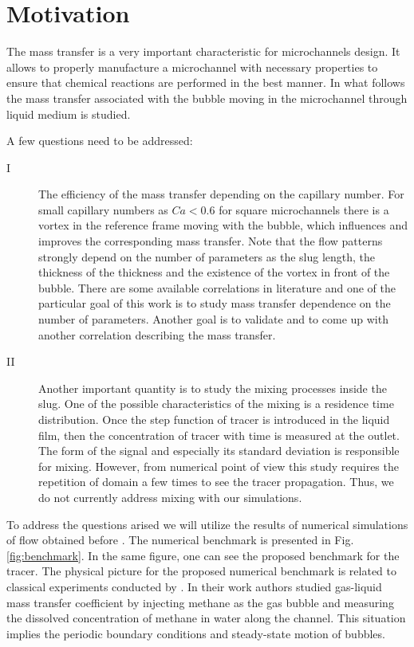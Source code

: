 \documentclass{article}
\begin{document}
\section{Motivation}
The mass transfer is a very important characteristic for microchannels  design. It allows to
properly manufacture a microchannel with necessary properties to ensure that chemical
reactions are performed in the best manner. In
what follows the mass transfer associated with the bubble moving in the microchannel through liquid
medium is studied. 

A few questions need to be addressed:
\begin{description}
 \item[I] The efficiency of the mass transfer depending on the capillary number. For small capillary
numbers as $Ca<0.6$ for square microchannels there is a vortex in the reference frame moving with
the bubble, which  influences and improves the corresponding mass transfer. 
Note that the flow
patterns strongly depend on the number of parameters as the slug length, the thickness of the
thickness and the existence of the vortex in front of the bubble. There are some available
correlations in literature \cite{bercic-mass,kreutzer-overview} and one of the particular goal of
this work is to study mass transfer dependence on the number of parameters. Another goal is to
validate and to come up with another correlation describing the mass transfer.

 \item[II] Another important quantity is to study the mixing processes inside the slug. One of the
possible characteristics of the mixing is a residence time distribution. Once the step function
of tracer is introduced in the liquid film, then the concentration of tracer with time is
measured at the outlet. The form of the signal and especially its standard deviation is responsible
for mixing. However, from numerical point of view this study requires the repetition of domain a
few times to see the tracer propagation. Thus, we do not currently address mixing with our
simulations.
\end{description}

To address the questions arised we will utilize the results of numerical simulations of flow
obtained
before \cite{kuzmin-binary2d}. The numerical benchmark is presented in Fig. \ref{fig:benchmark}. In
the same figure, one can see the proposed benchmark for the tracer. The
physical
picture for the proposed numerical benchmark is  related to classical experiments conducted by
\citet{bercic-mass}. In their work authors studied gas-liquid mass transfer coefficient by
injecting methane as the gas bubble and measuring the dissolved concentration of methane in water
along the channel. This situation implies the periodic boundary conditions and steady-state motion
of bubbles.  
\end{document}

